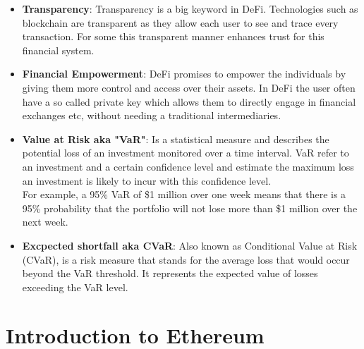 \documentclass{article}
\begin{document}
\begin{itemize}
    \item \textbf{Transparency}: Transparency is a big keyword in DeFi. Technologies such as blockchain are transparent as they allow each user to see and trace every transaction. For some this transparent manner enhances trust for this financial system.
     \item \textbf{Financial Empowerment}: DeFi promises to empower the individuals by giving them more control and access over their assets. In DeFi the user often have a so called private key which allows them to directly engage in financial exchanges etc, without needing a traditional intermediaries.
      \item \textbf{Value at Risk aka "VaR"}: Is a statistical measure and describes the potential loss of an investment monitored over a time interval. VaR refer to an investment and a certain confidence level and estimate the maximum loss an investment is likely to incur with this confidence level.\\
For example, a 95\% VaR of \$1 million over one week means that there is a 95\% probability that the portfolio will not lose more than \$1 million over the next week.
\item \textbf{Excpected shortfall aka CVaR}:
Also known as Conditional Value at Risk (CVaR), is a risk measure that stands for the average loss that would occur beyond the VaR threshold. It represents the expected value of losses exceeding the VaR level.  
\end{itemize}

\section{Introduction to Ethereum}
\end{document}
